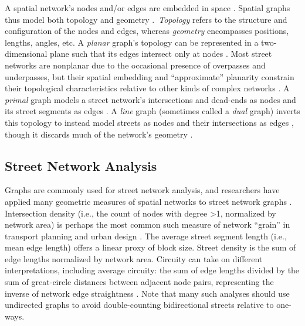 \documentclass[12pt,letterpaper]{article} %
\begin{document}
A spatial network's nodes and/or edges are embedded in space \citep{barthelemy_spatial_2022}. Spatial graphs thus model both topology and geometry \citep{fischer_spatial_2014}.\ \textit{Topology} refers to the structure and configuration of the nodes and edges, whereas \textit{geometry} encompasses positions, lengths, angles, etc. A \textit{planar} graph's topology can be represented in a two-dimensional plane such that its edges intersect only at nodes \citep{barthelemy_modeling_2008}. Most street networks are nonplanar due to the occasional presence of overpasses and underpasses, but their spatial embedding and \enquote{approximate} planarity constrain their topological characteristics relative to other kinds of complex networks \citep{boeing_planarity_2020}. A \textit{primal} graph models a street network's intersections and dead-ends as nodes and its street segments as edges \citep{porta_network_2006-1}. A \textit{line} graph (sometimes called a \textit{dual} graph) inverts this topology to instead model streets as nodes and their intersections as edges \citep{porta_network_2006}, though it discards much of the network's geometry \citep{ratti_space_2004}.

\subsection{Street Network Analysis}\label{sec:street_network_analysis}

Graphs are commonly used for street network analysis, and researchers have applied many geometric measures of spatial networks to street network graphs \citep{barthelemy_spatial_2011}. Intersection density (i.e., the count of nodes with degree >1, normalized by network area) is perhaps the most common such measure of network \enquote{grain} in transport planning and urban design \citep[e.g.,][]{ewing_travel_2010}. The average street segment length (i.e., mean edge length) offers a linear proxy of block size. Street density is the sum of edge lengths normalized by network area. Circuity can take on different interpretations, including average circuity: the sum of edge lengths divided by the sum of great-circle distances between adjacent node pairs, representing the inverse of network edge straightness \citep{boeing_urban_2019}. Note that many such analyses should use undirected graphs to avoid double-counting bidirectional streets relative to one-ways.
\end{document}
